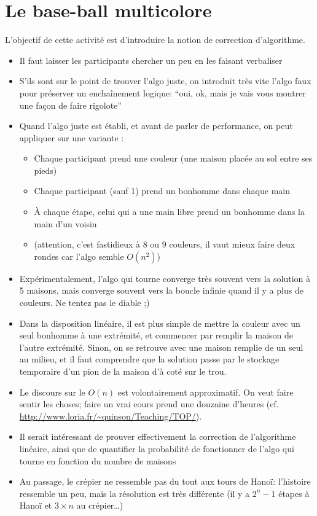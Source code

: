 \documentclass[a5paper,pagesize,DIV=14]{scrbook}
\begin{document}
\section*{Le base-ball multicolore}

L'objectif de cette activité est d'introduire la notion de correction d'algorithme.

\begin{itemize}
  \item Il faut laisser les participants chercher un peu en les faisant verbaliser
  \item S'ils sont sur le point de trouver l'algo juste, on introduit très vite l'algo faux pour préserver un enchaînement logique: ``oui, ok, mais je vais vous montrer une façon de faire rigolote''
  \item Quand l'algo juste est établi, et avant de parler de performance, on peut appliquer sur une variante :
    \begin{itemize}
    \item Chaque participant prend une couleur (une maison placée au sol entre ses pieds)
    \item Chaque participant (sauf 1) prend un bonhomme dans chaque main
    \item À chaque étape, celui qui a une main libre prend un bonhomme dans la main d'un voisin
    \item (attention, c'est fastidieux à 8 ou 9 couleurs, il vaut mieux faire deux rondes car l'algo semble $O(n^2)$)
    \end{itemize}
  \item Expérimentalement, l'algo qui tourne converge très souvent vers la solution à 5 maisons, mais converge souvent vers la boucle infinie quand il y a plus de couleurs. Ne tentez pas le diable ;)
  \item Dans la disposition linéaire, il est plus simple de mettre la couleur avec un seul bonhomme à une extrémité, et commencer par remplir la maison de l'autre extrémité. Sinon, on se retrouve avec une maison remplie de un seul au milieu, et il faut comprendre que la solution passe par le stockage temporaire d'un pion de la maison d'à coté sur le trou.
  \item Le discours sur le $O(n)$ est volontairement approximatif. On veut faire sentir les choses; faire un vrai cours prend une douzaine d'heures (cf. \url{http://www.loria.fr/~quinson/Teaching/TOP/}).
  \item Il serait intéressant de prouver effectivement la correction de l'algorithme linéaire, ainsi que de quantifier la probabilité de fonctionner de l'algo qui tourne en fonction du nombre de maisons
  \item Au passage, le crépier ne ressemble pas du tout aux tours de Hanoï: l'histoire ressemble un peu, mais la résolution est très différente (il y a $2^n-1$ étapes à Hanoï et $3\times n$ au crépier\ldots)
\end{itemize}
\end{document}
